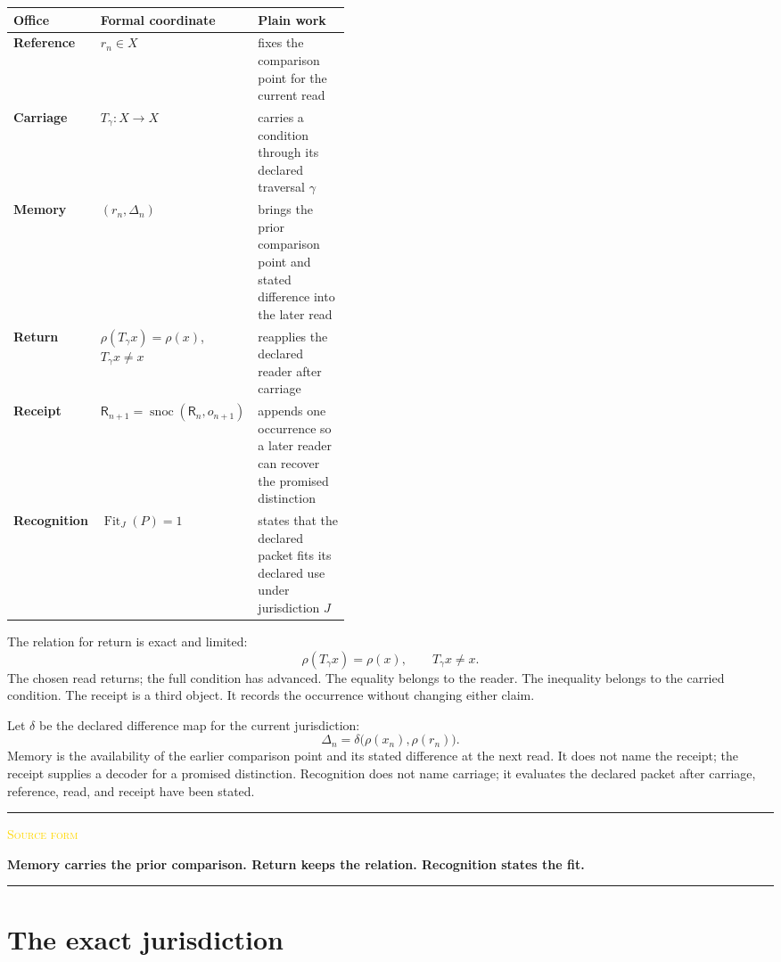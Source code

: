 \documentclass[11pt]{article}
\newcommand{\smallcaps}[1]{{\footnotesize\textsc{#1}}}
\DeclareMathOperator{\snoc}{snoc}
\newenvironment{claimbox}[1]{%
  \par\vspace{0.55em}\noindent\begin{minipage}{\linewidth}
  \color{line}\rule{\linewidth}{0.55pt}\par\vspace{0.34em}%
  \textcolor{gold}{\smallcaps{#1}}\par\vspace{0.3em}\color{ink}%
}{%
  \par\vspace{0.38em}\color{line}\rule{\linewidth}{0.55pt}%
  \end{minipage}\par\vspace{0.55em}%
}
\begin{document}
\begin{center}
\begin{tabularx}{\linewidth}{@{}>{\bfseries}p{0.17\linewidth}p{0.27\linewidth}Y@{}}
\toprule
Office & Formal coordinate & Plain work \\
\midrule
Reference & $r_n\in X$ & fixes the comparison point for the current read \\
Carriage & $T_\gamma:X\to X$ & carries a condition through its declared traversal $\gamma$ \\
Memory & $(r_n,\Delta_n)$ & brings the prior comparison point and stated difference into the later read \\
Return & $\rho(T_\gamma x)=\rho(x)$, $T_\gamma x\ne x$ & reapplies the declared reader after carriage \\
Receipt & $\mathsf R_{n+1}=\snoc(\mathsf R_n,o_{n+1})$ & appends one occurrence so a later reader can recover the promised distinction \\
Recognition & $\operatorname{Fit}_J(P)=1$ & states that the declared packet fits its declared use under jurisdiction $J$ \\
\bottomrule
\end{tabularx}
\end{center}

The relation for return is exact and limited:
\[
\boxed{\rho(T_\gamma x)=\rho(x),\qquad T_\gamma x\ne x.}
\tag{2}\label{eq:return}
\]
The chosen read returns; the full condition has advanced. The equality belongs to the reader. The inequality belongs to the carried condition. The receipt is a third object. It records the occurrence without changing either claim.

Let $\delta$ be the declared difference map for the current jurisdiction:
\[
\Delta_n=\delta\bigl(\rho(x_n),\rho(r_n)\bigr).
\tag{3}\label{eq:difference}
\]
Memory is the availability of the earlier comparison point and its stated difference at the next read. It does not name the receipt; the receipt supplies a decoder for a promised distinction. Recognition does not name carriage; it evaluates the declared packet after carriage, reference, read, and receipt have been stated.

\begin{claimbox}{Source form}
\textbf{Memory carries the prior comparison. Return keeps the relation. Recognition states the fit.}
\end{claimbox}

\section{The exact jurisdiction}
\end{document}
